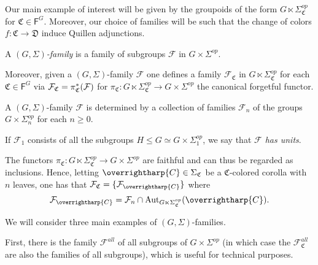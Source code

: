 \documentclass[a4paper,10pt
,draft
]{article}%
\renewcommand{\F}{\mathcal F}
\renewcommand{\1}{\eta}%
\newcommand{\vect}[1]{\text{\overrightharp{\ensuremath{#1}}}}
\begin{document}
Our main example of interest will be given by the groupoids of the form
$G \ltimes \Sigma^{op}_{\mathfrak{C}}$ for 
$\mathfrak{C} \in \mathsf{F}^G$.
Moreover, our choice of families will be such that the
change of colors $f\colon \mathfrak{C} \to \mathfrak{D}$ 
induce Quillen adjunctions.


\begin{definition}\label{GSFAM_DEF}
A \emph{$(G,\Sigma)$-family} is a family of subgroups $\mathcal{F}$ in $G \times \Sigma^{op}$.

Moreover, given a $(G,\Sigma)$-family $\F$
one defines a family
$\mathcal{F}_{\mathfrak{C}}$ in
$G \ltimes \Sigma^{op}_{\mathfrak{C}}$
for each $\mathfrak{C} \in \mathsf{F}^G$
via $\mathcal{F}_{\mathfrak{C}} = \pi^{\**}_{\mathfrak{C}}(\mathcal{F})$
for $\pi_{\mathfrak{C}} \colon G \ltimes \Sigma_{\mathfrak{C}}^{op} \to G \times \Sigma^{op}$
the canonical forgetful functor.
\end{definition}



\begin{remark}
A $(G,\Sigma)$-family $\F$
is determined by a collection of families
$\F_n$ of the groups $G\times \Sigma_n^{op}$ for each $n \geq 0$.
\end{remark}



\begin{notation}\label{HASUNIT NOT}
If $\F_1$ consists of all the subgroups 
$H \leq G \simeq G \times \Sigma_1^{op}$, 
we say that \textit{$\F$ has units}.
\end{notation}



\begin{remark}
The functors
$\pi_{\mathfrak{C}} \colon
G \ltimes \Sigma_{\mathfrak{C}}^{op} \to
G \times \Sigma^{op}$
are faithful and can thus be regarded as inclusions.
Hence, letting $\vect{C} \in \Sigma_{\mathfrak{C}}$ be a
$\mathfrak{C}$-colored corolla with $n$ leaves,
one has that
$\F_{\mathfrak{C}} = \{\F_{\vect{C}}\}$ where
\begin{equation}\label{FAMC_DEF_EQ}
	\F_{\vect{C}} = \F_n \cap \Aut_{G \ltimes \Sigma_{\mathfrak C}^{op}}(\vect C).
\end{equation}
\end{remark}


We will consider three main examples of $(G,\Sigma)$-families.

First, there is the family $\F^{all}$ of all subgroups of $G \times \Sigma^{op}$
(in which case the $\F^{all}_{\mathfrak{C}}$ are also the families of all subgroups), which is useful for technical purposes.
\end{document}
